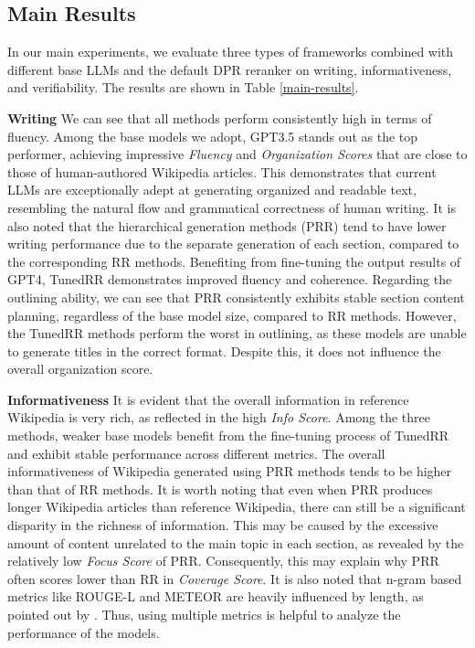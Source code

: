 \documentclass[11pt]{article}
\begin{document}
\subsection{Main Results}
\label{sec:main_results}
In our main experiments, we evaluate three types of frameworks combined with different base LLMs and the default DPR reranker on writing, informativeness, and verifiability. The results are shown in Table \ref{main-results}.

\noindent \textbf{Writing}\quad 
We can see that all methods perform consistently high in terms of fluency. Among the base models we adopt, GPT3.5 stands out as the top performer, achieving impressive \textit{Fluency} and \textit{Organization Scores} that are close to those of human-authored Wikipedia articles. This demonstrates that current LLMs are exceptionally adept at generating organized and readable text, resembling the natural flow and grammatical correctness of human writing. It is also noted that the hierarchical generation methods (PRR) tend to have lower writing performance due to the separate generation of each section, compared to the corresponding RR methods. Benefiting from fine-tuning the output results of GPT4, TunedRR demonstrates improved fluency and coherence. Regarding the outlining ability, we can see that PRR consistently exhibits stable section content planning, regardless of the base model size, compared to RR methods. However, the TunedRR methods perform the worst in outlining, as these models are unable to generate titles in the correct format. Despite this, it does not influence the overall organization score.

\noindent \textbf{Informativeness}\quad
It is evident that the overall information in reference Wikipedia is very rich, as reflected in the high \textit{Info Score}. Among the three methods, weaker base models benefit from the fine-tuning process of TunedRR and exhibit stable performance across different metrics. The overall informativeness of Wikipedia generated using PRR methods tends to be higher than that of RR methods. It is worth noting that even when PRR produces longer Wikipedia articles than reference Wikipedia, there can still be a significant disparity in the richness of information. This may be caused by the excessive amount of content unrelated to the main topic in each section, as revealed by the relatively low \textit{Focus Score} of PRR. Consequently, this may explain why PRR often scores lower than RR in \textit{Coverage Score}. It is also noted that n-gram based metrics like ROUGE-L and METEOR are heavily influenced by length, as pointed out by \citet{krishna-etal-2021-hurdles}. Thus, using multiple metrics is helpful to analyze the performance of the models.
\end{document}
